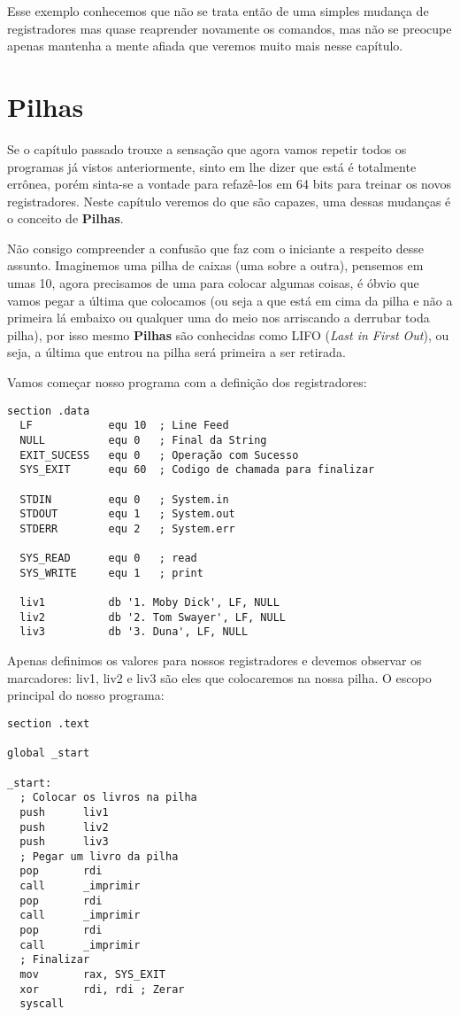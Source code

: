 Esse exemplo conhecemos que não se trata então de uma simples mudança de registradores mas quase reaprender novamente os comandos, mas não se preocupe apenas mantenha a mente afiada que veremos muito mais nesse capítulo.

\section{Pilhas}
Se o capítulo passado trouxe a sensação que agora vamos repetir todos os programas já vistos anteriormente, sinto em lhe dizer que está é totalmente errônea, porém sinta-se a vontade para refazê-los em 64 bits para treinar os novos registradores. Neste capítulo veremos do que são capazes, uma dessas mudanças é o conceito de \textbf{Pilhas}.

Não consigo compreender a confusão que faz com o iniciante a respeito desse assunto. Imaginemos uma pilha de caixas (uma sobre a outra), pensemos em umas 10, agora precisamos de uma para colocar algumas coisas, é óbvio que vamos pegar a última que colocamos (ou seja a que está em cima da pilha e não a primeira lá embaixo ou qualquer uma do meio nos arriscando a derrubar toda pilha), por isso mesmo \textbf{Pilhas} são conhecidas como LIFO (\textit{Last in First Out}), ou seja, a última que entrou na pilha será primeira a ser retirada.

Vamos começar nosso programa com a definição dos registradores:
\begin{lstlisting}[]
section .data
  LF            equ 10  ; Line Feed
  NULL          equ 0   ; Final da String
  EXIT_SUCESS   equ 0   ; Operação com Sucesso
  SYS_EXIT      equ 60  ; Codigo de chamada para finalizar

  STDIN         equ 0   ; System.in
  STDOUT        equ 1   ; System.out
  STDERR        equ 2   ; System.err

  SYS_READ      equ 0   ; read
  SYS_WRITE     equ 1   ; print

  liv1          db '1. Moby Dick', LF, NULL
  liv2          db '2. Tom Swayer', LF, NULL  
  liv3          db '3. Duna', LF, NULL
\end{lstlisting}

Apenas definimos os valores para nossos registradores e devemos observar os marcadores: liv1, liv2 e liv3 são eles que colocaremos na nossa pilha. O escopo principal do nosso programa:
\begin{lstlisting}[]
section .text

global _start

_start:
  ; Colocar os livros na pilha
  push      liv1
  push      liv2
  push      liv3
  ; Pegar um livro da pilha
  pop       rdi
  call      _imprimir
  pop       rdi
  call      _imprimir
  pop       rdi
  call      _imprimir
  ; Finalizar
  mov       rax, SYS_EXIT
  xor 		rdi, rdi ; Zerar
  syscall
\end{lstlisting}

